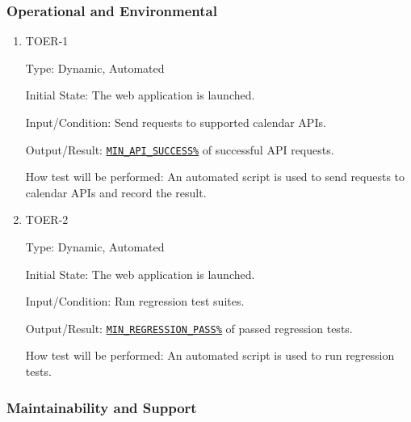 \documentclass[12pt, titlepage]{article}
\begin{document}
\subsubsection{Operational  and Environmental}

\begin{enumerate}
\item{TOER-1\\}\label{TOER-1}

Type: Dynamic, Automated
					
Initial State: The web application is launched.
					
Input/Condition: Send requests to supported calendar APIs.
					
Output/Result: \hyperref[MIN_API_SUCCESS]{\texttt{MIN\_API\_SUCCESS\%}} of successful API requests.
					
How test will be performed: An automated script is used to send requests to calendar APIs and record the result.


\item{TOER-2\\}\label{TOER-2}

Type: Dynamic, Automated
					
Initial State: The web application is launched.
					
Input/Condition: Run regression test suites.
					
Output/Result: \hyperref[MIN_REGRESSION_PASS]{\texttt{MIN\_REGRESSION\_PASS\%}} of passed regression tests.
					
How test will be performed: An automated script is used to run regression tests.

\end{enumerate}
\subsubsection{Maintainability and Support}
\end{document}
